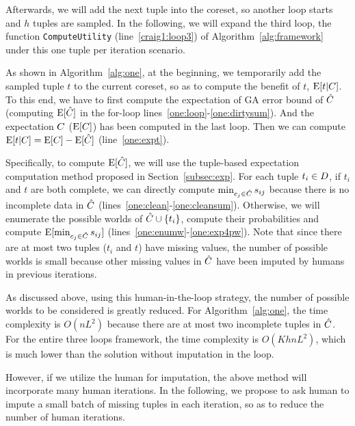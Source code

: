 Afterwards, we will add the next tuple into the coreset, so another loop starts and $h$ tuples are sampled. In the following, we will expand the third loop,   \ie the function \texttt{ComputeUtility} (line~\ref{craig1:loop3})  of Algorithm~\ref{alg:framework} under this one tuple per iteration scenario. 




As shown in Algorithm~\ref{alg:one}, at the beginning, we temporarily add the sampled tuple $t$ to the current coreset, so as to compute the benefit of $t$, \ie  $\mathrm{E}[t|C]$. To this end, we have to first  compute the expectation  of GA error bound of $\hat{C}$   (\ie computing $\mathrm{E}[\hat{C}]$ in the for-loop lines~\ref{one:loop}-\ref{one:dirtysum}). And the expectation \wrt $C$ (\ie $\mathrm{E}[C]$) has been computed in the last loop. Then we can compute $\mathrm{E}[t|C] = \mathrm{E}[C] - \mathrm{E}[\hat{C}]$ (line~\ref{one:expt}).


Specifically, to compute $\mathrm{E}[\hat{C}]$, we will use the tuple-based expectation computation method proposed in Section~\ref{subsec:exp}. For each tuple $t_i\in D$, if $t_i$ and $t$ are both complete, we can directly compute $\min_{c_j\in \hat{C}}s_{ij}$ because there is no incomplete data in $\hat{C}$ (lines~\ref{one:clean}-\ref{one:cleansum}). Otherwise, we will enumerate the possible worlds of $\hat{C} \cup \{t_i\}$, compute their probabilities and compute $\mathrm{E}[\min_{c_j\in \hat{C}}s_{ij}]$
 (lines~\ref{one:enumw}-\ref{one:exp4pw}).
  Note that since there are at most two tuples (\ie $t_i$ and $t$) have missing values, the number of possible worlds is small because other missing values in $\hat{C}$ have been imputed by humans in previous iterations.

 As discussed above, using this human-in-the-loop strategy, the number of possible worlds to be considered is greatly reduced. For   Algorithm~\ref{alg:one}, the time complexity is $O(nL^2)$ because there are at most two incomplete tuples in $\hat{C}$. For the entire three loops framework, the time complexity is  $O(KhnL^2)$, which is much lower  than the solution without imputation in the loop.
  
  However,  if we utilize the human for imputation, the above method  will incorporate many human iterations. In the following,  we propose to ask human to impute a small batch of missing tuples in each iteration, so as to reduce the  number of human iterations.
  

